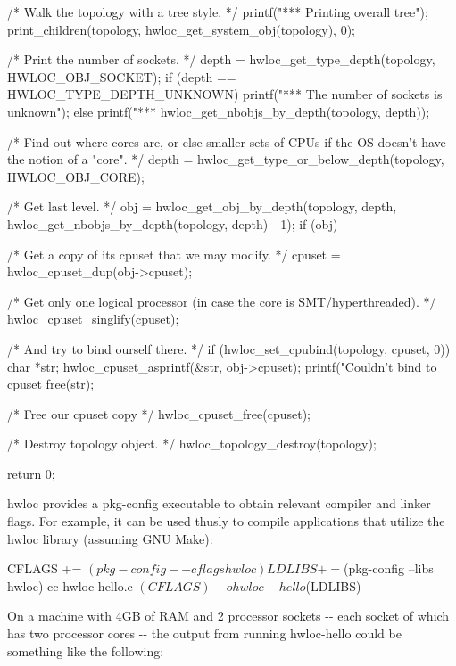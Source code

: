 \begin{DoxyCodeInclude}
{    /* Walk the topology with a tree style. */
    printf("*** Printing overall tree\n");
    print_children(topology, hwloc_get_system_obj(topology), 0);

    /* Print the number of sockets. */
    depth = hwloc_get_type_depth(topology, HWLOC_OBJ_SOCKET);
    if (depth == HWLOC_TYPE_DEPTH_UNKNOWN) {
        printf("*** The number of sockets is unknown\n");
    } else {
        printf("*** %
               hwloc_get_nbobjs_by_depth(topology, depth));
    }

    /* Find out where cores are, or else smaller sets of CPUs if 
       the OS doesn't have the notion of a "core". */
    depth = hwloc_get_type_or_below_depth(topology, HWLOC_OBJ_CORE);

    /* Get last level. */
    obj = hwloc_get_obj_by_depth(topology, depth, 
                   hwloc_get_nbobjs_by_depth(topology, depth) - 1);
    if (obj) {
        /* Get a copy of its cpuset that we may modify. */
        cpuset = hwloc_cpuset_dup(obj->cpuset);
    
        /* Get only one logical processor (in case the core is
           SMT/hyperthreaded). */
        hwloc_cpuset_singlify(cpuset);

        /* And try to bind ourself there. */
        if (hwloc_set_cpubind(topology, cpuset, 0)) {
            char *str;
            hwloc_cpuset_asprintf(&str, obj->cpuset);
            printf("Couldn't bind to cpuset %
            free(str);
        }

        /* Free our cpuset copy */
        hwloc_cpuset_free(cpuset);
    }

    /* Destroy topology object. */
    hwloc_topology_destroy(topology);

    return 0;
}
\end{DoxyCodeInclude}


hwloc provides a {\ttfamily pkg-\/config} executable to obtain relevant compiler and linker flags. For example, it can be used thusly to compile applications that utilize the hwloc library (assuming GNU Make):

\begin{DoxyVerb}
CFLAGS += $(pkg-config --cflags hwloc)
LDLIBS += $(pkg-config --libs hwloc)
cc hwloc-hello.c $(CFLAGS) -o hwloc-hello $(LDLIBS)
\end{DoxyVerb}


On a machine with 4GB of RAM and 2 processor sockets -\/-\/ each socket of which has two processor cores -\/-\/ the output from running {\ttfamily hwloc-\/hello} could be something like the following:

